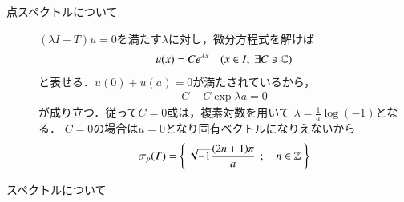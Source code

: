 	\begin{prf}\mbox{}
		\begin{description}
			\item[点スペクトルについて]
				$(\lambda I - T) u = 0$を満たす$\lambda$に対し，微分方程式を解けば
				\begin{align}
					u(x) = Ce^{\lambda x}
					\quad (x \in I,\ \exists C \ni \mathbb{C})
				\end{align}
				と表せる．$u(0) + u(a) = 0$が満たされているから，
				\begin{align}
					C + C\exp{\lambda a} = 0
				\end{align}
				が成り立つ．従って$C = 0$或は，複素対数を用いて
				$\lambda = \frac{1}{a} \log{(-1)}$となる．
				$C = 0$の場合は$u = 0$となり固有ベクトルになりえないから
				\begin{align}
					\mathfrak{\sigma}_p (T) = \left\{\ \sqrt{-1} \frac{(2 n + 1)\pi}{a}\ \, ; \quad n \in \mathbb{Z}\ \right\}
				\end{align}
				
			\item[スペクトルについて]
		\end{description}
	\end{prf}
